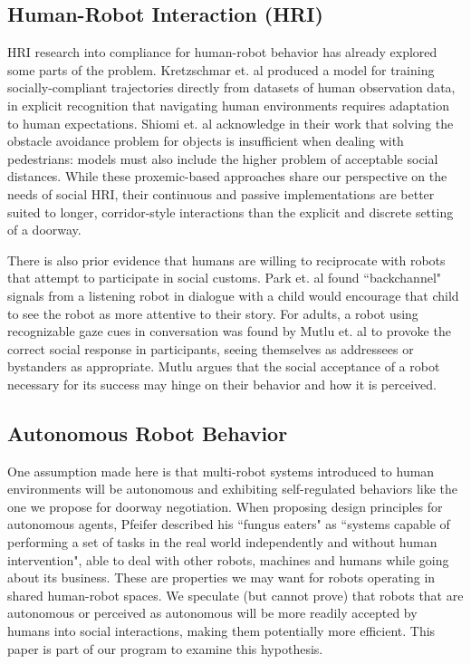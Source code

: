 \documentclass[letterpaper, 10 pt, conference]{ieeeconf}  %
\begin{document}
\subsection{Human-Robot Interaction (HRI)}
HRI research into compliance for human-robot behavior has already explored some parts of the problem. Kretzschmar et. al\cite{kretzschmar2016socially} produced a model for training socially-compliant trajectories directly from datasets of human observation data, in explicit recognition that navigating human environments requires adaptation to human expectations. Shiomi et. al\cite{shiomi2014towards} acknowledge in their work that solving the obstacle avoidance problem for objects is insufficient when dealing with pedestrians: models must also include the higher problem of acceptable social distances. While these proxemic-based approaches share our perspective on the needs of social HRI, their continuous and passive implementations are better suited to longer, corridor-style interactions than the explicit and discrete setting of a doorway.

There is also prior evidence that humans are willing to reciprocate with robots that attempt to participate in social customs. Park et. al\cite{park2017backchannel} found ``backchannel" signals from a listening robot in dialogue with a child would encourage that child to see the robot as more attentive to their story. For adults, a robot using recognizable gaze cues in conversation was found by Mutlu et. al\cite{mutlu2009footing} to provoke the correct social response in participants, seeing themselves as addressees or bystanders as appropriate. Mutlu argues that the social acceptance of a robot necessary for its success may hinge on their behavior and how it is perceived.

\subsection{Autonomous Robot Behavior}

One assumption made here is that multi-robot systems introduced to human environments will be autonomous and exhibiting self-regulated behaviors like the one we propose for doorway negotiation. When proposing design principles for autonomous agents\cite{pfeifer1996building}, Pfeifer described his ``fungus eaters" as ``systems capable of performing a set of tasks in the real world independently and without human intervention", able to deal with other robots, machines and humans while going about its business. These are properties we may want for robots operating in shared human-robot spaces. We speculate (but cannot prove) that robots that are autonomous or perceived as autonomous will be more readily accepted by humans into social interactions, making them potentially more efficient. This paper is part of our program to examine this hypothesis. 
\end{document}
